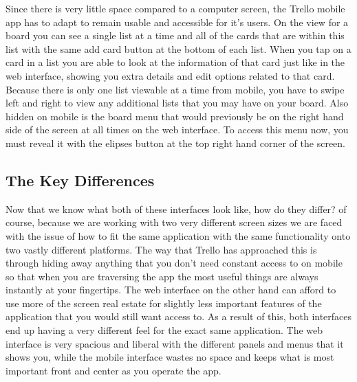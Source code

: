 \documentclass{scrartcl}
\begin{document}
Since there is very little space compared to a computer screen, the Trello mobile app has to adapt to
remain usable and accessible for it's users. On the view for a board you can see a single list at a
time and all of the cards that are within this list with the same add card button at the bottom of
each list. When you tap on a card in a list you are able to look at the information of that card just
like in the web interface, showing you extra details and edit options related to that card. Because
there is only one list viewable at a time from mobile, you have to swipe left and right to view any
additional lists that you may have on your board. Also hidden on mobile is the board menu that would
previously be on the right hand side of the screen at all times on the web interface. To access this
menu now, you must reveal it with the elipses button at the top right hand corner of the screen.

\pagebreak

\subsection*{The Key Differences}
Now that we know what both of these interfaces look like, how do they differ? of course, because we
are working with two very different screen sizes we are faced with the issue of how to fit the same
application with the same functionality onto two vastly different platforms. The way that Trello has
approached this is through hiding away anything that you don't need constant access to on mobile so
that when you are traversing the app the most useful things are always instantly at your fingertips.
The web interface on the other hand can afford to use more of the screen real estate for slightly
less important features of the application that you would still want access to. As a result of this,
both interfaces end up having a very different feel for the exact same application. The web interface
is very spacious and liberal with the different panels and menus that it shows you, while the mobile
interface wastes no space and keeps what is most important front and center as you operate the app.
\end{document}
